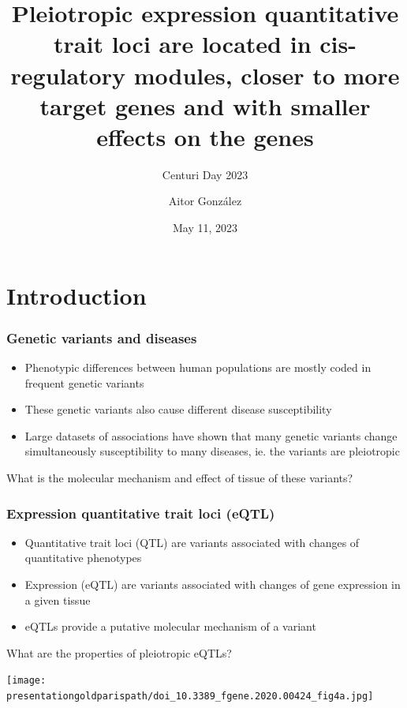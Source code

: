 \documentclass{beamer}
\title{Pleiotropic expression quantitative trait loci are located in cis-regulatory modules, closer to more target genes and with smaller effects on the genes}
\subtitle{Centuri Day 2023}
\author{Aitor Gonz\'alez}
\institute{Aix Marseille Univ, INSERM, TAGC}
\date{May 11, 2023}
\newcommand*{\presentationgoldparispath}{../presentation_230120_gold2022_paris/fig/}%
\begin{document}
    \begin{frame}

        \titlepage

    \end{frame}


    \section{Introduction} %

    \begin{frame}
        \frametitle{Genetic variants and diseases}

        \begin{itemize}
            \item Phenotypic differences between human populations are mostly coded in frequent genetic variants
            \item These genetic variants also cause different disease susceptibility
            \item Large datasets of associations have shown that many genetic variants change simultaneously susceptibility to many diseases, ie. the variants are pleiotropic
        \end{itemize}
%
        \vfill
%
        What is the molecular mechanism and effect of tissue of these variants?

    \end{frame}

    \begin{frame}
        \frametitle{Expression quantitative trait loci (eQTL)}

        \begin{itemize}
            \item Quantitative trait loci (QTL) are variants associated with changes of quantitative phenotypes
            \item Expression (eQTL) are variants associated with changes of gene expression in a given tissue
            \item eQTLs provide a putative molecular mechanism of a variant
        \end{itemize}
        \vfill
        What are the properties of pleiotropic eQTLs?

        \texttt{[image: \\presentationgoldparispath/doi\_10.3389\_fgene.2020.00424\_fig4a.jpg]}

        \let\thefootnote\relax{}
    \end{frame}
\end{document}
